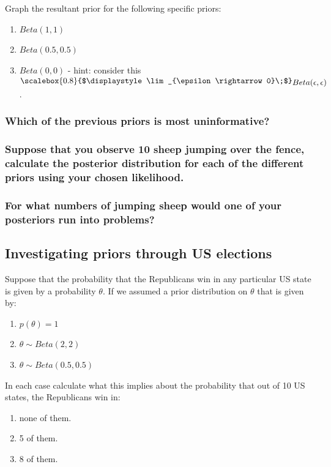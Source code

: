 \documentclass[11pt,fullpage]{book}
\newcommand{\Lim}[1]{\raisebox{0.5ex}{\scalebox{0.8}{$\displaystyle \lim_{#1}\;$}}}
\begin{document}
Graph the resultant prior for the following specific priors:

\begin{enumerate}
\item $Beta(1,1)$
\item $Beta(0.5,0.5)$
\item $Beta(0,0)$ - hint: consider this $\Lim{\epsilon \rightarrow 0} Beta(\epsilon,\epsilon)$.
\end{enumerate}

\subsubsection{Which of the previous priors is most uninformative?}
\subsubsection{Suppose that you observe 10 sheep jumping over the fence, calculate the posterior distribution for each of the different priors using your chosen likelihood.}
\subsubsection{For what numbers of jumping sheep would one of your posteriors run into problems?}

\subsection{Investigating priors through US elections}
Suppose that the probability that the Republicans win in any particular US state is given by a probability $\theta$. If we assumed a prior distribution on $\theta$ that is given by:

\begin{enumerate}
\item $p(\theta) = 1$
\item $\theta\sim Beta(2,2)$
\item $\theta\sim Beta(0.5,0.5)$
\end{enumerate}

In each case calculate what this implies about the probability that out of 10 US states, the Republicans win in:\\

\begin{enumerate}
\item none of them.
\item 5 of them.
\item 8 of them.
\end{enumerate}
\end{document}
